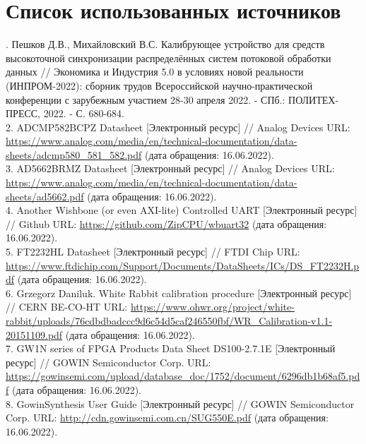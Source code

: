 \clearpage                                  %
\chapter*{Список использованных источников}
\label{references}
\printbibliography[env=SSTfirst] 
. Пешков Д.В., Михайловский В.С. Калибрующее устройство для средств высокоточной синхронизации распределённых систем потоковой обработки данных // Экономика и Индустрия 5.0 в условиях новой реальности (ИНПРОМ-2022): сборник трудов Всероссийской научно-практической конференции с зарубежным участием 28-30 апреля 2022. - СПб.: ПОЛИТЕХ-ПРЕСС, 2022. - С. 680-684.\\
2. ADCMP582BCPZ Datasheet [Электронный ресурс] // Analog Devices URL: \url{https://www.analog.com/media/en/technical-documentation/data-sheets/adcmp580\_581\_582.pdf} (дата обращения: 16.06.2022).\\
3. AD5662BRMZ Datasheet [Электронный ресурс] // Analog Devices URL: \url{https://www.analog.com/media/en/technical-documentation/data-sheets/ad5662.pdf} (дата обращения: 16.06.2022).\\
4. Another Wishbone (or even AXI-lite) Controlled UART [Электронный ресурс] // Github URL: \url{https://github.com/ZipCPU/wbuart32} (дата обращения: 16.06.2022).\\
5. FT2232HL Datasheet [Электронный ресурс] // FTDI Chip URL: \url{https://www.ftdichip.com/Support/Documents/DataSheets/ICs/DS\_FT2232H.pdf} (дата обращения: 16.06.2022).\\
6. Grzegorz Daniluk. White Rabbit calibration procedure [Электронный ресурс] // CERN BE-CO-HT URL: \url{https://www.ohwr.org/project/white-rabbit/uploads/76cdbdbadccc9d6c54d5caf246550fbf/WR\_Calibration-v1.1-20151109.pdf} (дата обращения: 16.06.2022).\\
7. GW1N series of FPGA Products Data Sheet DS100-2.7.1E [Электронный ресурс] // GOWIN Semiconductor Corp. URL: \url{https://gowinsemi.com/upload/database\_doc/1752/document/6296db1b68af5.pdf} (дата обращения: 16.06.2022).\\
8. GowinSynthesis User Guide [Электронный ресурс] // GOWIN Semiconductor Corp. URL: \url{http://cdn.gowinsemi.com.cn/SUG550E.pdf} (дата обращения: 16.06.2022).\\
